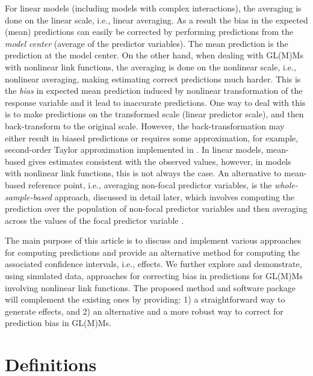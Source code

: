 For linear models (including models with complex interactions), the averaging is done on the linear scale, i.e., linear averaging. As a result the bias in the expected (mean) predictions can easily be corrected by performing predictions from the \emph{model center} (average of the predictor variables). The mean prediction is the prediction at the model center. On the other hand, when dealing with GL(M)Ms with nonlinear link functions, the averaging is done on the nonlinear scale, i.e., nonlinear averaging, making estimating correct predictions much harder. This is the \emph{bias} in expected mean prediction induced by nonlinear transformation of the response variable and it lead to inaccurate predictions. One way to deal with this is to make predictions on the transformed scale (linear predictor scale), and then back-transform to the original scale. However, the back-transformation may either result in biased predictions or requires some approximation, for example, second-order Taylor approximation implemented in  \citep{lenth2018package}. In linear models, mean-based gives estimates consistent with the observed values, however, in models with nonlinear link functions, this is not always the case. An alternative to mean-based reference point, i.e., averaging non-focal predictor variables, is the \emph{whole-sample-based} approach, discussed in detail later, which involves computing the prediction over the population of non-focal predictor variables and then averaging across the values of the focal predictor variable \citep{hanmer2013behind}. 


The main purpose of this article is to discuss and implement various approaches for computing predictions and provide an alternative method for computing the associated confidence intervals, i.e., effects. We further explore and demonstrate, using simulated data, approaches for correcting bias in predictions for GL(M)Ms involving nonlinear link functions. The proposed method and  software package will complement the existing ones by providing: 1) a straightforward way to generate effects, and 2) an alternative and a more robust way to correct for prediction bias in GL(M)Ms.


\section{Definitions}

